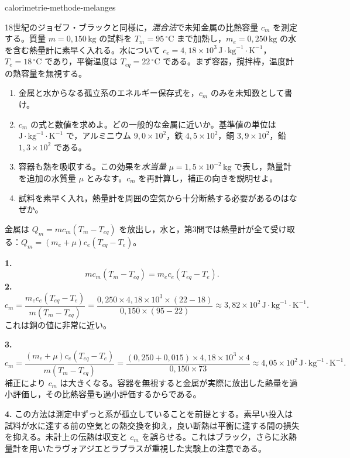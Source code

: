 \begin{exo}[混合法による金属の比熱容量の決定]{calorimetrie-methode-melanges}

18世紀のジョゼフ・ブラックと同様に，\emph{混合法}で未知金属の比熱容量 $c_m$ を測定する。質量 $m=0{,}150\,\text{kg}$ の試料を $T_m=95\,^\circ\text{C}$ まで加熱し，$m_e=0{,}250\,\text{kg}$ の水を含む熱量計に素早く入れる。水について $c_e=4{,}18\times10^3\,\text{J}\!\cdot\!\text{kg}^{-1}\!\cdot\!\text{K}^{-1}$，$T_e=18\,^\circ\text{C}$ であり，平衡温度は $T_{eq}=22\,^\circ\text{C}$ である。まず容器，撹拌棒，温度計の熱容量を無視する。
\begin{enumerate}
  \item 金属と水からなる孤立系のエネルギー保存式を，$c_m$ のみを未知数として書け。
  \item $c_m$ の式と数値を求めよ。どの一般的な金属に近いか。基準値の単位は $\text{J}\!\cdot\!\text{kg}^{-1}\!\cdot\!\text{K}^{-1}$ で，アルミニウム $9{,}0\times10^2$，鉄 $4{,}5\times10^2$，銅 $3{,}9\times10^2$，鉛 $1{,}3\times10^2$ である。
  \item 容器も熱を吸収する。この効果を\emph{水当量} $\mu=1{,}5\times10^{-2}\,\text{kg}$ で表し，熱量計を追加の水質量 $\mu$ とみなす。$c_m$ を再計算し，補正の向きを説明せよ。
  \item 試料を素早く入れ，熱量計を周囲の空気から十分断熱する必要があるのはなぜか。
\end{enumerate}
\begin{indication}
金属は $Q_m=mc_m(T_m-T_{eq})$ を放出し，水と，第3問では熱量計が全て受け取る：$Q_m=(m_e+\mu)c_e(T_{eq}-T_e)$。
\end{indication}
\begin{solution}
\textbf{1.}
\[
mc_m(T_m-T_{eq})=m_ec_e(T_{eq}-T_e).
\]
\textbf{2.}
\[
c_m=\frac{m_ec_e(T_{eq}-T_e)}{m(T_m-T_{eq})}
=\frac{0{,}250\times4{,}18\times10^3\times(22-18)}{0{,}150\times(95-22)}
\approx3{,}82\times10^2\,\text{J}\!\cdot\!\text{kg}^{-1}\!\cdot\!\text{K}^{-1}.
\]
これは銅の値に非常に近い。

\textbf{3.}
\[
c_m=\frac{(m_e+\mu)c_e(T_{eq}-T_e)}{m(T_m-T_{eq})}
=\frac{(0{,}250+0{,}015)\times4{,}18\times10^3\times4}{0{,}150\times73}
\approx4{,}05\times10^2\,\text{J}\!\cdot\!\text{kg}^{-1}\!\cdot\!\text{K}^{-1}.
\]
補正により $c_m$ は大きくなる。容器を無視すると金属が実際に放出した熱量を過小評価し，その比熱容量も過小評価するからである。

\textbf{4.} この方法は測定中ずっと系が孤立していることを前提とする。素早い投入は試料が水に達する前の空気との熱交換を抑え，良い断熱は平衡に達する間の損失を抑える。未計上の伝熱は収支と $c_m$ を誤らせる。これはブラック，さらに氷熱量計を用いたラヴォアジエとラプラスが重視した実験上の注意である。
\end{solution}
\end{exo}

